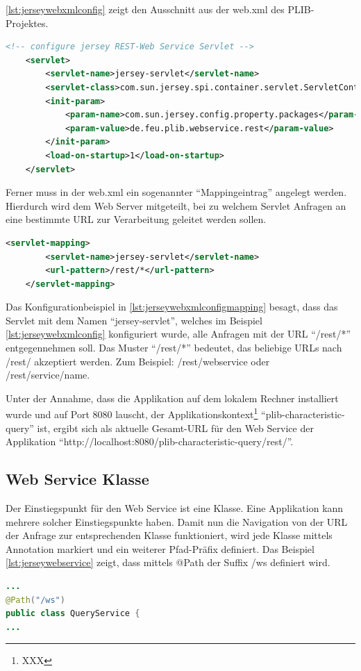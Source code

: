 \autoref{lst:jerseywebxmlconfig} zeigt den Ausschnitt aus der web.xml des \gls{PLIB}-Projektes. 

 \begin{lstlisting}[caption=Jersey Servlet Konfiguration in web.xml, language=XML, label=lst:jerseywebxmlconfig]
 <!-- configure jersey REST-Web Service Servlet -->
    <servlet>
        <servlet-name>jersey-servlet</servlet-name>
        <servlet-class>com.sun.jersey.spi.container.servlet.ServletContainer</servlet-class>
        <init-param>
            <param-name>com.sun.jersey.config.property.packages</param-name>
            <param-value>de.feu.plib.webservice.rest</param-value>
        </init-param>
        <load-on-startup>1</load-on-startup>
    </servlet>
 \end{lstlisting}   
 
Ferner muss in der web.xml ein sogenannter \enquote{Mappingeintrag} angelegt werden. Hierdurch wird dem Web Server mitgeteilt, bei zu welchem Servlet Anfragen an eine bestimmte URL zur Verarbeitung geleitet werden sollen. 
 
  \begin{lstlisting}[caption=Jersey Servlet Mappingkonfiguration in web.xml, language=XML, label=lst:jerseywebxmlconfigmapping]
    <servlet-mapping>
        <servlet-name>jersey-servlet</servlet-name>
        <url-pattern>/rest/*</url-pattern>
    </servlet-mapping>
 \end{lstlisting}  
 
Das Konfigurationbeispiel in \autoref{lst:jerseywebxmlconfigmapping}  besagt, dass das Servlet mit dem Namen \enquote{jersey-servlet}, welches im Beispiel \autoref{lst:jerseywebxmlconfig}  konfiguriert wurde, alle Anfragen mit der URL \enquote{/rest/*} entgegennehmen soll. Das Muster \enquote{/rest/*} bedeutet, das beliebige URLs nach /rest/ akzeptiert werden. Zum Beispiel: /rest/webservice oder /rest/service/name.

Unter der Annahme, dass die Applikation auf dem lokalem Rechner installiert wurde und auf Port 8080 lauscht, der Applikationskontext\footnote{XXX} \enquote{plib-characteristic-query} ist, ergibt sich als aktuelle Gesamt-URL für den Web Service der Applikation \enquote{http://localhost:8080/plib-characteristic-query/rest/}.
 

\subsection{Web Service Klasse}
Der Einstiegspunkt für den \gls{Web Service} ist eine Klasse. Eine Applikation kann mehrere solcher Einstiegspunkte haben. Damit nun die Navigation von der URL der Anfrage zur entsprechenden Klasse funktioniert, wird jede Klasse mittels Annotation markiert und ein weiterer Pfad-Präfix definiert. Das Beispiel 
\autoref{lst:jerseywebservice} zeigt, dass mittels @Path der Suffix /ws definiert wird. 
  \begin{lstlisting}[caption=Jersey Web Service Klasse, language=Java, label=lst:jerseywebservice]
...
@Path("/ws")
public class QueryService {
...
 \end{lstlisting}  
 

